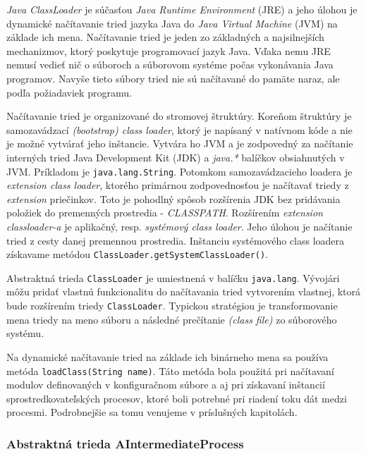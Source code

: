 \emph{Java ClassLoader} je súčasťou \emph{Java Runtime Environment} (JRE) a jeho úlohou je dynamické
načítavanie tried jazyka Java do \emph{Java Virtual Machine} (JVM) na základe ich mena. 
Načítavanie tried je jeden zo základných a najsilnejších mechanizmov, ktorý poskytuje programovací jazyk
Java. Vďaka nemu JRE nemusí vedieť nič o súboroch a súborovom systéme počas vykonávania Java programov. 
Navyše tieto súbory tried nie sú načítavané do pamäte naraz, ale podľa požiadaviek 
programu. \citep{mcmanis, travis}

Načítavanie tried je organizované do stromovej štruktúry. Koreňom štruktúry je samozavádzací 
\emph{(bootstrap) class loader}, ktorý je napísaný v natívnom kóde a nie je možné vytvárať jeho inštancie. 
Vytvára ho 
JVM a je zodpovedný za načítanie interných tried Java Development Kit (JDK) a \emph{java.*} balíčkov 
obsiahnutých v JVM. Príkladom je \verb|java.lang.String|. Potomkom samozavádzacieho loadera je 
\emph{extension class loader},
ktorého primárnou zodpovednosťou je načítavať triedy z \emph{extension} priečinkov. Toto je pohodlný 
spôsob rozšírenia JDK bez pridávania položiek do premenných prostredia - \emph{CLASSPATH}. 
Rozšírením \emph{extension classloader-a} je aplikačný, resp. \emph{systémový class loader}. Jeho úlohou 
je načítanie tried z cesty danej premennou prostredia. Inštanciu systémového class loadera získavame 
metódou \verb|ClassLoader.getSystemClassLoader()|. \citep{techjava, antl}

Abstraktná trieda \verb|ClassLoader| je umiestnená v balíčku \verb|java.lang|. Vývojári môžu pridať 
vlastnú 
funkcionalitu do načítavania tried vytvorením vlastnej, ktorá bude rozšírením triedy 
\verb|ClassLoader|. Typickou stratégiou je transformovanie mena triedy na meno súboru a následné 
prečítanie  \emph{(class file)} zo súborového systému. \citep{christudas, classloader}

Na dynamické načítavanie tried na základe ich binárneho mena sa používa metóda \verb|loadClass(String name)|.
Táto metóda bola použitá pri načítavaní modulov definovaných v konfiguračnom súbore a aj pri získavaní 
inštancií sprostredkovateľských procesov, ktoré boli potrebné pri riadení toku dát medzi procesmi.
Podrobnejšie sa tomu venujeme v príslušných kapitolách. 



\subsubsection{Abstraktná trieda AIntermediateProcess} 

